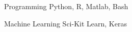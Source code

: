 

\begin{cvskills}

  \cvskill
    {Programming} %
    {Python, R, Matlab, Bash}

  \cvskill
    {Machine Learning} %
    {Sci-Kit Learn, Keras} %

\end{cvskills}
